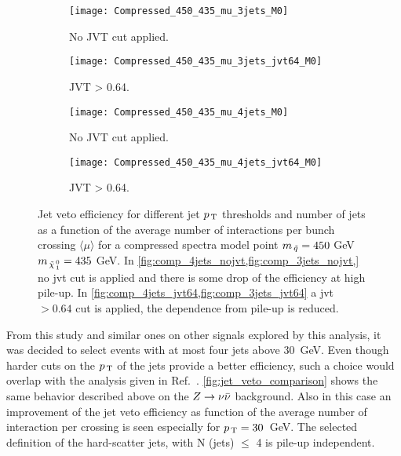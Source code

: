 \begin{figure}[!htb]
  \centering
  \begin{subfigure}[t]{.48\linewidth}
    \texttt{[image: Compressed\_450\_435\_mu\_3jets\_M0]}
    \caption{No JVT cut applied.}
    \label{fig:comp_3jets_nojvt}
  \end{subfigure}
  \begin{subfigure}[t]{.48\linewidth}
    \texttt{[image: Compressed\_450\_435\_mu\_3jets\_jvt64\_M0]}
    \caption{JVT > 0.64.}
    \label{fig:comp_3jets_jvt64}
  \end{subfigure}
  \begin{subfigure}[t]{.48\linewidth}
    \texttt{[image: Compressed\_450\_435\_mu\_4jets\_M0]}
    \caption{No JVT cut applied.}
    \label{fig:comp_4jets_nojvt}
  \end{subfigure}
  \begin{subfigure}[t]{.48\linewidth}
    \texttt{[image: Compressed\_450\_435\_mu\_4jets\_jvt64\_M0]}
    \caption{JVT > 0.64.}
    \label{fig:comp_4jets_jvt64}
  \end{subfigure}
  \caption{Jet veto efficiency for different jet $p_\mathrm{\, T}$ thresholds and number of
    jets as a function of the average number of interactions per bunch crossing
    $\langle \mu \rangle$ for a compressed spectra model point $m_{\, \tilde{q}} = 450$
    GeV $m_{\, \tilde{\chi}_{\, 1}^{\, 0}} = 435$ GeV. In
    \cref{fig:comp_4jets_nojvt,fig:comp_3jets_nojvt,} no \gls{jvt} cut is
    applied and there is some drop of the efficiency at high pile-up. In
    \cref{fig:comp_4jets_jvt64,fig:comp_3jets_jvt64} a \gls{jvt} $> 0.64$ cut is
    applied, the dependence from pile-up is reduced.}
  \label{fig:comp_eff}
\end{figure}
From this study and similar ones on other signals explored by this analysis, it
was decided to select events with at most four jets above 30~GeV. Even though
harder cuts on the $p_\mathrm{\, T}$ of the jets provide a better efficiency, such a choice
would overlap with the analysis given in Ref.~\cite{MultijetSUSY}.
\cref{fig:jet_veto_comparison} shows the same behavior described above on the
$Z \rightarrow \nu \bar{\nu}$ background. Also in this case an improvement of the jet veto efficiency
as function of the average number of interaction per crossing is seen especially
for $p_\mathrm{\, T} = 30$~GeV. The selected definition of the hard-scatter jets, with N
(jets) $\leq$ 4 is pile-up independent.
